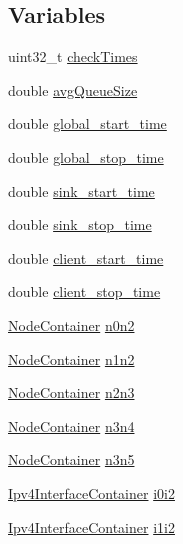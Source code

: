 \subsection*{Variables}
\begin{DoxyCompactItemize}
\item 
uint32\+\_\+t \hyperlink{red-tests_8cc_aeea215f1e5c3568bca85c126b9870c09}{check\+Times}
\item 
double \hyperlink{red-tests_8cc_a678439115cbaacad91df6add33b0cb0b}{avg\+Queue\+Size}
\item 
double \hyperlink{red-tests_8cc_ab3a0ca969f11332a6b4ca8bc81e19ba7}{global\+\_\+start\+\_\+time}
\item 
double \hyperlink{red-tests_8cc_a374328526043935f11841a7ec7e396d5}{global\+\_\+stop\+\_\+time}
\item 
double \hyperlink{red-tests_8cc_a2c56dc9b543a4442a7edd8d680c4a1bc}{sink\+\_\+start\+\_\+time}
\item 
double \hyperlink{red-tests_8cc_a2462eef540f5b896f14d4ea7b7bb6214}{sink\+\_\+stop\+\_\+time}
\item 
double \hyperlink{red-tests_8cc_a18ff86acaf663200fbedb1f77d03b515}{client\+\_\+start\+\_\+time}
\item 
double \hyperlink{red-tests_8cc_aee714f5dcf74da2f73bcdd66c8a9e265}{client\+\_\+stop\+\_\+time}
\item 
\hyperlink{classns3_1_1NodeContainer}{Node\+Container} \hyperlink{red-tests_8cc_aeaa87dbd052b50719525adea0f586b36}{n0n2}
\item 
\hyperlink{classns3_1_1NodeContainer}{Node\+Container} \hyperlink{red-tests_8cc_a68f69f65725cbe7529e8b594708b8fc0}{n1n2}
\item 
\hyperlink{classns3_1_1NodeContainer}{Node\+Container} \hyperlink{red-tests_8cc_a4bc708159d3ec761080f4639c1c8f409}{n2n3}
\item 
\hyperlink{classns3_1_1NodeContainer}{Node\+Container} \hyperlink{red-tests_8cc_a71269c713841141f40860e991d435588}{n3n4}
\item 
\hyperlink{classns3_1_1NodeContainer}{Node\+Container} \hyperlink{red-tests_8cc_af4c498a2bfb720685107e00e03067e31}{n3n5}
\item 
\hyperlink{classns3_1_1Ipv4InterfaceContainer}{Ipv4\+Interface\+Container} \hyperlink{red-tests_8cc_a04048bb862423a1ed10deed33021fe0c}{i0i2}
\item 
\hyperlink{classns3_1_1Ipv4InterfaceContainer}{Ipv4\+Interface\+Container} \hyperlink{red-tests_8cc_abe23af3b1cb569ee9ee4ed7370791041}{i1i2}
\item 

\end{DoxyCompactItemize}

